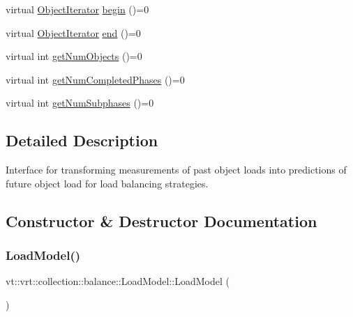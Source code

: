 \begin{DoxyCompactItemize}
virtual \hyperlink{classvt_1_1vrt_1_1collection_1_1balance_1_1_object_iterator}{Object\+Iterator} \hyperlink{classvt_1_1vrt_1_1collection_1_1balance_1_1_load_model_a6ca139b4f14d79d1d59b46016efae221}{begin} ()=0
\item 
virtual \hyperlink{classvt_1_1vrt_1_1collection_1_1balance_1_1_object_iterator}{Object\+Iterator} \hyperlink{classvt_1_1vrt_1_1collection_1_1balance_1_1_load_model_a8474fb097bddbd75711e1e8d74084651}{end} ()=0
\item 
virtual int \hyperlink{classvt_1_1vrt_1_1collection_1_1balance_1_1_load_model_a87b90c2daf3a34243a7a2af266aa0b29}{get\+Num\+Objects} ()=0
\item 
virtual int \hyperlink{classvt_1_1vrt_1_1collection_1_1balance_1_1_load_model_adb8e89bfd2fcb625326cf8a9446d8091}{get\+Num\+Completed\+Phases} ()=0
\item 
virtual int \hyperlink{classvt_1_1vrt_1_1collection_1_1balance_1_1_load_model_ab46ea62e4228d4a64de9dd0adfe81af2}{get\+Num\+Subphases} ()=0
\end{DoxyCompactItemize}


\subsection{Detailed Description}
Interface for transforming measurements of past object loads into predictions of future object load for load balancing strategies. 

\subsection{Constructor \& Destructor Documentation}
\mbox{\label{classvt_1_1vrt_1_1collection_1_1balance_1_1_load_model_a90f345e752441d66b2893027f2626226}} 
\subsubsection{\texorpdfstring{Load\+Model()}{LoadModel()}}
{\footnotesize\ttfamily vt\+::vrt\+::collection\+::balance\+::\+Load\+Model\+::\+Load\+Model (\begin{DoxyParamCaption}{ }\end{DoxyParamCaption})\hspace{0.3cm}{\ttfamily [default]}}

